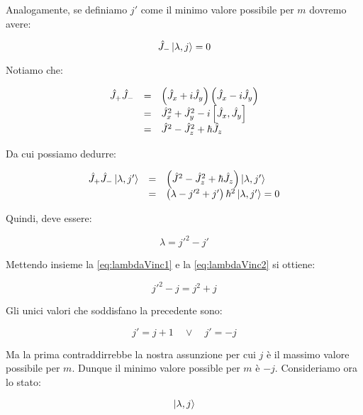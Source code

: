 Analogamente, se definiamo $j'$ come il minimo valore possibile per $m$ dovremo avere:

	\begin{equation}
		\hat{J}_- \ket{\lambda, j} = 0
	\end{equation}

Notiamo che:

	\begin{equation}
		\begin{array}{c c l}
			\hat{J}_+ \hat{J}_- & = & \left ( \hat{J}_x + i \hat{J}_y \right ) \left ( \hat{J}_x - i \hat{J}_y \right ) \\
			& = & \hat{J}^2_x + \hat{J}^2_y - i \left [ \hat{J}_x, \hat{J}_y \right ] \\
			& = & \hat{J}^2 - \hat{J}^2_z + \hbar \hat{J}_z
		\end{array}
	\end{equation}

Da cui possiamo dedurre:

	\begin{equation}
		\begin{array}{c c l}
			\hat{J}_+ \hat{J}_- \ket{\lambda, j'} & = & \left ( \hat{J}^2 - \hat{J}_z^2 + \hbar \hat{J}_z \right ) \ket{\lambda, j'}\\

		& = & \left ( \lambda - j'^2 + j' \right ) \hbar^2 \ket{\lambda, j'} = 0
		\end{array}
	\end{equation}

Quindi, deve essere:

	\begin{equation} \label{eq:lambdaVinc2}
		\lambda  = j'^2 - j'
	\end{equation}

Mettendo insieme la \eqref{eq:lambdaVinc1} e la \eqref{eq:lambdaVinc2} si ottiene:

	\begin{equation}
		j'^2 - j = j^2 + j
	\end {equation}

Gli unici valori che soddisfano la precedente sono:

	\[
		j' = j + 1 \quad \vee \quad j' = -j
	\]

Ma la prima contraddirrebbe la nostra assunzione per cui $j$ \`e il massimo valore possibile per $m$. Dunque il minimo valore possible per $m$ \`e $-j$. Consideriamo ora lo stato:

	\[
		\ket{\lambda, j}
	\]

